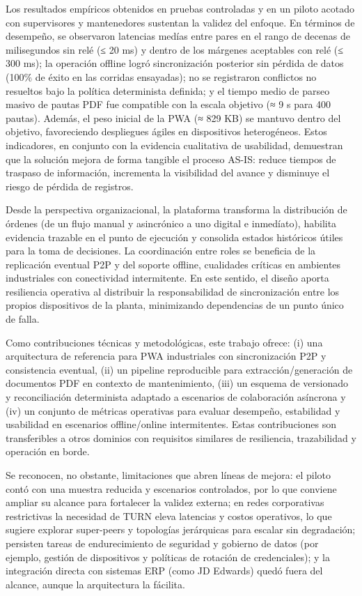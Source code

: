 \documentclass[10pt,a4paper]{report}
\begin{document}
Los resultados empíricos obtenidos en pruebas controladas y en un piloto acotado con supervisores y mantenedores sustentan la validez del enfoque. En términos de desempeño, se observaron latencias medías entre pares en el rango de decenas de milisegundos sin relé (≤ 20 ms) y dentro de los márgenes aceptables con relé (≤ 300 ms); la operación offline logró sincronización posterior sin pérdida de datos (100\% de éxito en las corridas ensayadas); no se registraron conflictos no resueltos bajo la política determinista definida; y el tiempo medio de parseo masivo de pautas PDF fue compatible con la escala objetivo (≈ 9 s para 400 pautas). Además, el peso inicial de la PWA (≈ 829 KB) se mantuvo dentro del objetivo, favoreciendo despliegues ágiles en dispositivos heterogéneos. Estos indicadores, en conjunto con la evidencia cualitativa de usabilidad, demuestran que la solución mejora de forma tangible el proceso AS-IS: reduce tiempos de traspaso de información, incrementa la visibilidad del avance y disminuye el riesgo de pérdida de registros.

Desde la perspectiva organizacional, la plataforma transforma la distribución de órdenes (de un flujo manual y asincrónico a uno digital e inmedíato), habilita evidencia trazable en el punto de ejecución y consolida estados históricos útiles para la toma de decisiones. La coordinación entre roles se beneficia de la replicación eventual P2P y del soporte offline, cualidades críticas en ambientes industriales con conectividad intermitente. En este sentido, el diseño aporta resiliencia operativa al distribuir la responsabilidad de sincronización entre los propios dispositivos de la planta, minimizando dependencias de un punto único de falla.

Como contribuciones técnicas y metodológicas, este trabajo ofrece: (i) una arquitectura de referencia para PWA industriales con sincronización P2P y consistencia eventual, (ii) un pipeline reproducible para extracción/generación de documentos PDF en contexto de mantenimiento, (iii) un esquema de versionado y reconciliación determinista adaptado a escenarios de colaboración asíncrona y (iv) un conjunto de métricas operativas para evaluar desempeño, estabilidad y usabilidad en escenarios offline/online intermitentes. Estas contribuciones son transferibles a otros dominios con requisitos similares de resiliencia, trazabilidad y operación en borde.

Se reconocen, no obstante, limitaciones que abren líneas de mejora: el piloto contó con una muestra reducida y escenarios controlados, por lo que conviene ampliar su alcance para fortalecer la validez externa; en redes corporativas restrictivas la necesidad de TURN eleva latencias y costos operativos, lo que sugiere explorar super-peers y topologías jerárquicas para escalar sin degradación; persisten tareas de endurecimiento de seguridad y gobierno de datos (por ejemplo, gestión de dispositivos y políticas de rotación de credenciales); y la integración directa con sistemas ERP (como JD Edwards) quedó fuera del alcance, aunque la arquitectura la fácilita.
\end{document}
